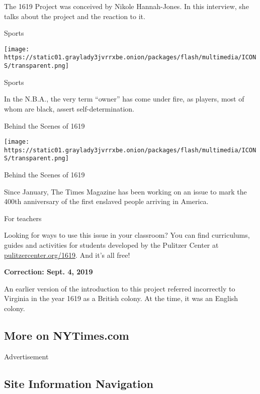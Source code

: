 The 1619 Project was conceived by Nikole Hannah-Jones. In this
interview, she talks about the project and the reaction to it.

\href{https://www.nytimes3xbfgragh.onion/2019/08/16/sports/basketball/slavery-anniversary-basketball-owners.html}{}

Sports

\texttt{[image: https://static01.graylady3jvrrxbe.onion/packages/flash/multimedia/ICONS/transparent.png]}

Sports

In the N.B.A., the very term ``owner'' has come under fire, as players,
most of whom are black, assert self-determination.

\href{https://www.nytimes3xbfgragh.onion/2019/08/18/reader-center/1619-project-slavery-jamestown.html}{}

Behind the Scenes of 1619

\texttt{[image: https://static01.graylady3jvrrxbe.onion/packages/flash/multimedia/ICONS/transparent.png]}

Behind the Scenes of 1619

Since January, The Times Magazine has been working on an issue to mark
the 400th anniversary of the first enslaved people arriving in America.

For teachers

Looking for ways to use this issue in your classroom? You can find
curriculums, guides and activities for students developed by the
Pulitzer Center at
\href{http://pulitzercenter.org/projects/1619-project-pulitzer-center-education-programming}{pulitzercenter.org/1619}.
And it's all free!

\textbf{Correction: Sept. 4, 2019}

An earlier version of the introduction to this project referred
incorrectly to Virginia in the year 1619 as a British colony. At the
time, it was an English colony.~

\hypertarget{more-on-nytimescom}{%
\subsection{More on NYTimes.com}\label{more-on-nytimescom}}

Advertisement

\hypertarget{site-information-navigation}{%
\subsection{Site Information
Navigation}\label{site-information-navigation}}

